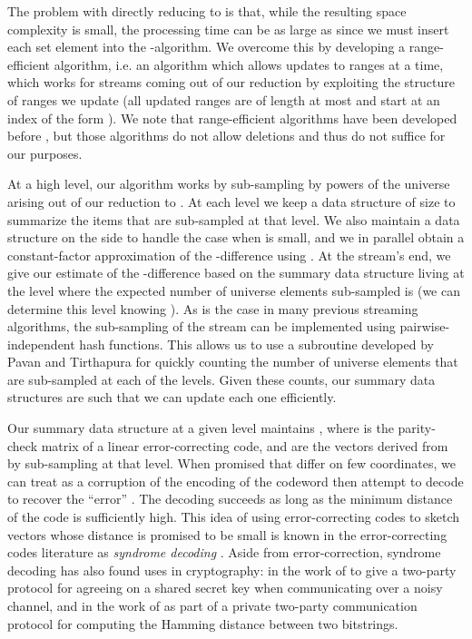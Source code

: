 \documentclass[letterpaper,11pt]{article}
\begin{document}
The problem with directly reducing to  is that, while the
resulting space complexity is small, the processing time can be as
large as  since we
must insert each set element into the -algorithm. We overcome
this by developing a range-efficient  algorithm, i.e. an
algorithm which allows updates to ranges at a time,
which works for streams coming out of our reduction by exploiting the
structure of ranges we update (all updated ranges
are of length at most  and start at an index of the form ).
We note that range-efficient  algorithms have been
developed before \cite{BKS02,PavanTir07}, but those algorithms do
not allow deletions and thus do not suffice for our purposes.

At a high level, our algorithm works by sub-sampling by powers of 
the universe  arising out of our reduction to . At each
level we keep a data structure of size
 to summarize the items that are
sub-sampled at that level. We also maintain a
data structure on the side to handle the case when  is
small, and we in parallel obtain a constant-factor approximation 
of the -difference using \cite{FKSV02}. At the stream's end, we
give our estimate of the -difference based on the summary data
structure living at the level where the expected number of universe
elements sub-sampled is  (we can
determine this level knowing ).
As is the case in many previous streaming algorithms, the sub-sampling
of the stream can be
implemented using pairwise-independent hash functions. This allows us
to use a subroutine developed by Pavan and Tirthapura
\cite{PavanTir07} for quickly counting the number of universe elements
that
are sub-sampled at each of the  levels. Given these counts,
our summary data structures are such that we can update each one
efficiently.

Our summary data structure at a given level maintains ,
where  is the parity-check matrix of
a linear error-correcting code, and  are the vectors derived
from  by sub-sampling at that level. When promised that
 differ on few coordinates, we can treat  as
a corruption of the encoding of the  codeword then attempt to
decode to recover the ``error'' . The decoding succeeds as long
as the minimum distance of the code is sufficiently high. This idea of
using error-correcting codes to
sketch vectors whose distance is promised to be small is known in the
error-correcting codes literature as {\em
  syndrome decoding} \cite{Wyner74}. Aside from error-correction,
syndrome decoding has also
found uses in cryptography: in the work of
\cite{BBR88,Smith07} to give a two-party protocol
for agreeing on a shared secret key when communicating over a noisy
channel, and in the work of \cite{FIMNSW06} as part of a private
two-party communication protocol for computing the Hamming distance
between two bitstrings.
\end{document}
